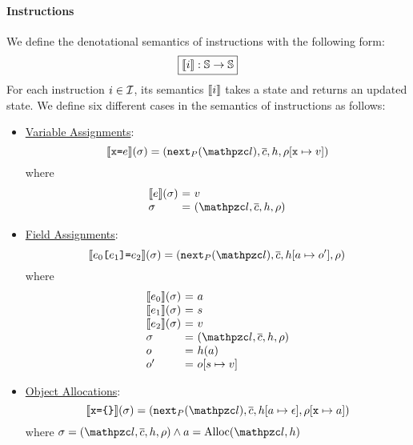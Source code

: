 \paragraph{Instructions} We define the denotational semantics of instructions
with the following form:
\[
  \framebox{$\sem{\inst}: \stset \rightarrow \stset$}
\]
For each instruction $i \in \mathcal{I}$, its semantics $\llbracket{i}\rrbracket$ takes a
state and returns an updated state. We define six different cases in the
semantics of instructions as follows:

\begin{itemize}
  \item \underline{Variable Assignments}:
    \[
      \sem{\varx \kweq \expr}(\st) =
      (\getnext{\prog}(\lab), \ctxts, \heap, \env[\varx \mapsto \val])
    \]
    where
    \[
      \begin{array}{l@{~}c@{~}l}
        \sem{\expr}(\st) &=& \val\\
        \st &=& (\lab, \ctxts, \heap, \env)\\
      \end{array}
    \]

  \item \underline{Field Assignments}:
    \[
      \sem{\expr_0 \kwsl \expr_1 \kwsr \kweq \expr_2}(\st) =
      (\getnext{\prog}(\lab), \ctxts, \heap[\addr \mapsto \obj'], \env)
    \]
    where
    \[
      \begin{array}{l@{~}c@{~}l}
        \sem{\expr_0}(\st) &=& \addr\\
        \sem{\expr_1}(\st) &=& \str\\
        \sem{\expr_2}(\st) &=& \val\\
        \st &=& (\lab, \ctxts, \heap, \env)\\
        \obj &=& \heap(\addr)\\
        \obj' &=& \obj[\str \mapsto \val]\\
      \end{array}
    \]

  \item \underline{Object Allocations}:
    \[
      \sem{\varx \kweq \kwcl \kwcr}(\st) =
      (\getnext{\prog}(\lab), \ctxts, \heap[\addr \mapsto \epsilon], \env[\varx \mapsto
      \addr])
    \]
    where $\st = (\lab, \ctxts, \heap, \env) \wedge \addr =
    \text{Alloc}(\lab, \heap)$


\end{itemize}
